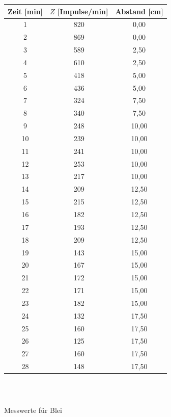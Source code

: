 \documentclass[fontsize=12pt]{scrartcl}
\begin{document}
\begin{figure}[h!]
\begin{minipage}{0.5\textwidth}
\centering
\vspace{-120pt}
\caption{Messwerte  für Aluminium}
\begin{tabular}{|c|c|c|} \hline
Zeit [min]	&	$Z$ [Impulse/min]	&	Abstand [cm] \\ \hline
1			&820		&0,00 \\ \hline
2			&869		&0,00 \\ \hline
3			&589		&2,50 \\ \hline
4			&610		&2,50 \\ \hline
5			&418		&5,00 \\ \hline
6			&436		&5,00 \\ \hline
7			&324		&7,50 \\ \hline
8			&340		&7,50 \\ \hline
9			&248		&10,00 \\ \hline
10		&239		&10,00 \\ \hline
11			&241		&10,00 \\ \hline
12		&253		&10,00 \\ \hline
13		&217		&10,00 \\ \hline
14		&209		&12,50 \\ \hline
15		&215		&12,50 \\ \hline
16		&182		&12,50 \\ \hline
17		&193		&12,50 \\ \hline
18		&209		&12,50 \\ \hline
19		&143		&15,00 \\ \hline
20		&167		&15,00 \\ \hline
21		&172		&15,00 \\ \hline
22		&171		&15,00 \\ \hline
23		&182		&15,00 \\ \hline
24		&132		&17,50 \\ \hline
25		&160		&17,50 \\ \hline
26		&125		&17,50 \\ \hline
27		&160		&17,50 \\ \hline
28		&148		&17,50 \\ \hline
\end{tabular} \\
\end{minipage}
\begin{minipage}{0.5\textwidth}
\centering
\caption{Messwerte  für Blei}
\begin{tabular}{|c|c|c|} \hline

\end{tabular}
\end{minipage}
\end{figure}
\end{document}
